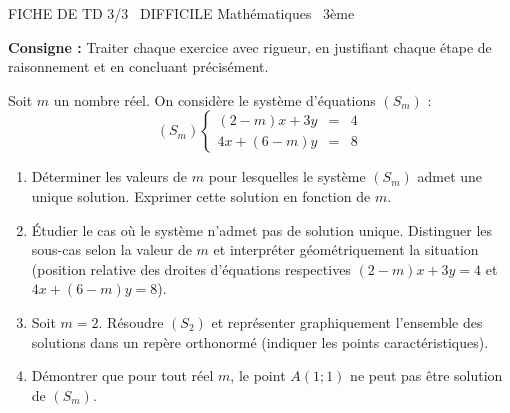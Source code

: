 \documentclass[11pt]{article}
\begin{document}
\begin{tcolorbox}[enhanced,colback=popink,colframe=popink,arc=10pt,boxrule=0pt,left=12pt,right=12pt,top=9pt,bottom=9pt]
{\color{white}\popxbold\small FICHE DE TD 3/3 \textbullet\ DIFFICILE \hfill Mathématiques \textbullet\ 3ème\par}
\end{tcolorbox}
\vspace{4pt}
\noindent \textbf{Consigne :} Traiter chaque exercice avec rigueur, en justifiant chaque étape de raisonnement et en concluant précisément.

\begin{exercice}
Soit $m$ un nombre réel. On considère le système d'équations $(S_m)$ :
\[
(S_m) \left\{ \begin{array}{rcl}
(2-m)x + 3y &=& 4 \\
4x + (6-m)y &=& 8
\end{array} \right.
\]
\begin{enumerate}
    \item Déterminer les valeurs de $m$ pour lesquelles le système $(S_m)$ admet une unique solution. Exprimer cette solution en fonction de $m$.
    \item Étudier le cas où le système n'admet pas de solution unique. Distinguer les sous-cas selon la valeur de $m$ et interpréter géométriquement la situation (position relative des droites d'équations respectives $(2-m)x+3y=4$ et $4x+(6-m)y=8$).
    \item Soit $m=2$. Résoudre $(S_2)$ et représenter graphiquement l'ensemble des solutions dans un repère orthonormé (indiquer les points caractéristiques).
    \item Démontrer que pour tout réel $m$, le point $A(1 ; 1)$ ne peut pas être solution de $(S_m)$.
\end{enumerate}
\end{exercice}
\end{document}
